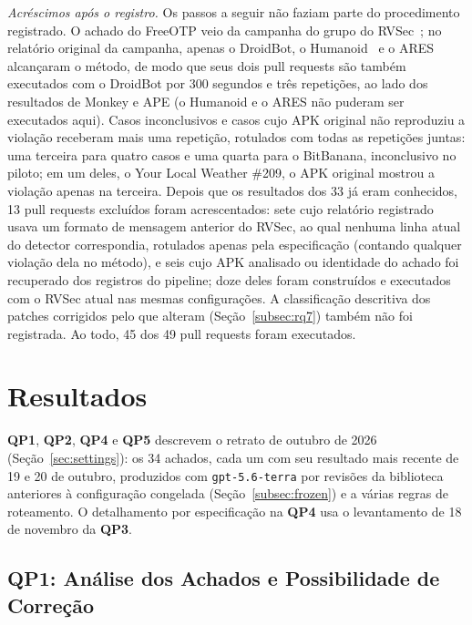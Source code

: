 \documentclass[conference]{IEEEtran}
\newcommand{\researchq}[1]{\textbf{QP#1}}
\begin{document}
\emph{Acréscimos após o registro.} Os passos a seguir não faziam parte do
procedimento registrado. O achado do FreeOTP veio da campanha do grupo do
RVSec~\cite{costa2026effectiveness}; no relatório original da campanha, apenas o
DroidBot, o Humanoid~\cite{li2019humanoid} e o ARES~\cite{romdhana2022ares}
alcançaram o método, de modo que seus dois pull requests são também executados
com o DroidBot por 300 segundos e três repetições, ao lado dos resultados de
Monkey e APE (o Humanoid e o ARES não puderam ser executados aqui). Casos inconclusivos e
casos cujo APK original não reproduziu a violação receberam mais uma repetição,
rotulados com todas as repetições juntas: uma terceira para quatro casos e uma
quarta para o BitBanana, inconclusivo no piloto; em um deles, o Your Local
Weather \#209, o APK original mostrou a violação apenas na terceira. Depois que os resultados dos
33 já eram conhecidos, 13 pull requests excluídos foram acrescentados: sete cujo
relatório registrado usava um formato de mensagem anterior do RVSec, ao qual
nenhuma linha atual do detector correspondia, rotulados apenas pela especificação
(contando qualquer violação dela no método), e seis cujo APK analisado ou
identidade do achado foi recuperado dos registros do pipeline; doze deles foram
construídos e executados com o RVSec atual nas mesmas configurações. A classificação descritiva dos patches corrigidos pelo que alteram
(Seção~\ref{subsec:rq7}) também não foi registrada. Ao todo, 45 dos 49 pull
requests foram executados.

\section{Resultados}
\label{sec:results}

\researchq{1}, \researchq{2}, \researchq{4} e \researchq{5} descrevem o
retrato de outubro de 2026 (Seção~\ref{sec:settings}):
os 34 achados, cada um com seu resultado mais recente de 19 e 20 de outubro,
produzidos com \texttt{gpt-5.6-terra} por revisões da biblioteca anteriores à
configuração congelada (Seção~\ref{subsec:frozen}) e a várias regras de roteamento. O detalhamento por especificação na \researchq{4} usa o
levantamento de 18 de novembro da \researchq{3}.

\subsection{\researchq{1}: Análise dos Achados e Possibilidade de Correção}
\label{subsec:rq1}
\end{document}
